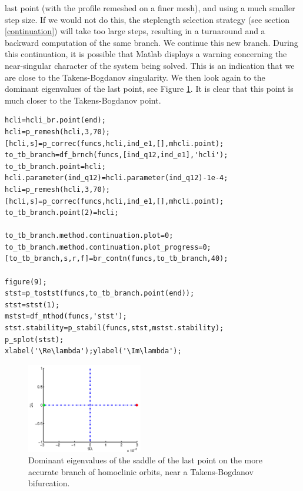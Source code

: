 \documentclass[10pt]{scrartcl}
\begin{document}
{last point (with the profile remeshed on a finer mesh), and using a
much smaller step size.  If we would not do this, the steplength
selection strategy (see section \ref{continuation}) will take too
large steps, resulting in a turnaround and a backward computation of
the same branch.  We continue this new branch.  During this
continuation, it is possible that Matlab displays a warning concerning
the near-singular character of the system being solved.  This is an
indication that we are close to the Takens-Bogdanov singularity.  We
then look again to the dominant eigenvalues of the last point, see
Figure \ref{demo3-9}.  It is clear that this point is much closer to
the Takens-Bogdanov point.  
\begin{lstlisting}
hcli=hcli_br.point(end);
hcli=p_remesh(hcli,3,70);
[hcli,s]=p_correc(funcs,hcli,ind_e1,[],mhcli.point);
to_tb_branch=df_brnch(funcs,[ind_q12,ind_e1],'hcli');
to_tb_branch.point=hcli;
hcli.parameter(ind_q12)=hcli.parameter(ind_q12)-1e-4;
hcli=p_remesh(hcli,3,70);
[hcli,s]=p_correc(funcs,hcli,ind_e1,[],mhcli.point);
to_tb_branch.point(2)=hcli;

to_tb_branch.method.continuation.plot=0;
to_tb_branch.method.continuation.plot_progress=0;
[to_tb_branch,s,r,f]=br_contn(funcs,to_tb_branch,40);

figure(9);
stst=p_tostst(funcs,to_tb_branch.point(end));
stst=stst(1);
mstst=df_mthod(funcs,'stst');
stst.stability=p_stabil(funcs,stst,mstst.stability);
p_splot(stst);
xlabel('\Re\lambda');ylabel('\Im\lambda');  
\end{lstlisting}

\begin{figure}
  \begin{center}
    \includegraphics[width=0.45\textwidth]{fig/hom_demfig09}
    \caption{Dominant eigenvalues of the saddle of the last point on the 
      more accurate branch
      of homoclinic orbits,
      near a Takens-Bogdanov bifurcation.\label{demo3-9}}
  \end{center}
\end{figure}


}
\end{document}
